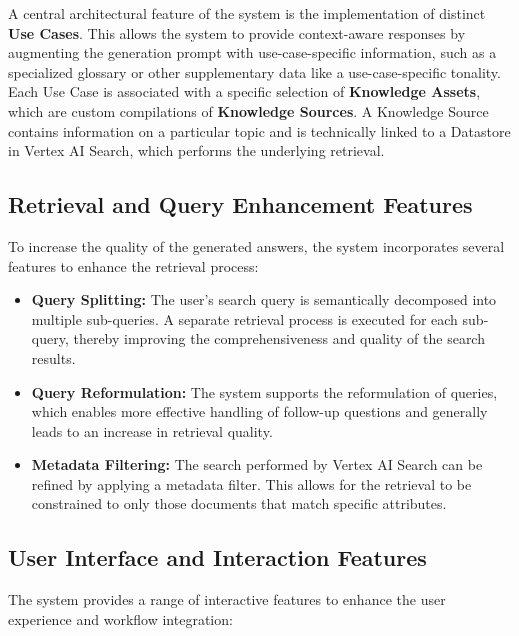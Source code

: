 \documentclass[
	english,
	ruledheaders=section,%
	class=report,%
	thesis={type=bachelor},%
	accentcolor=1b,%
	custommargins=true,%
	marginpar=false,%
	parskip=half-,%
	fontsize=11pt,%
	DIV=14,
]{tudapub}
\begin{document}
A central architectural feature of the system is the implementation of distinct \textbf{Use Cases}. This allows the system to provide context-aware responses by augmenting the generation prompt with use-case-specific information, such as a specialized glossary or other supplementary data like a use-case-specific tonality. Each Use Case is associated with a specific selection of \textbf{Knowledge Assets}, which are custom compilations of \textbf{Knowledge Sources}. A Knowledge Source contains information on a particular topic and is technically linked to a Datastore in Vertex AI Search, which performs the underlying retrieval.

\subsection{Retrieval and Query Enhancement Features}
To increase the quality of the generated answers, the system incorporates several features to enhance the retrieval process:

\begin{itemize}
    \item \textbf{Query Splitting:} The user's search query is semantically decomposed into multiple sub-queries. A separate retrieval process is executed for each sub-query, thereby improving the comprehensiveness and quality of the search results.
    
    \item \textbf{Query Reformulation:} The system supports the reformulation of queries, which enables more effective handling of follow-up questions and generally leads to an increase in retrieval quality.
    
    \item \textbf{Metadata Filtering:} The search performed by Vertex AI Search can be refined by applying a metadata filter. This allows for the retrieval to be constrained to only those documents that match specific attributes.
\end{itemize}

\subsection{User Interface and Interaction Features}
The system provides a range of interactive features to enhance the user experience and workflow integration:
\end{document}
